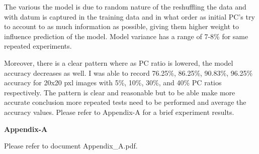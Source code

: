 \documentclass{proposalnsf}
\begin{document}
The various the model is due to random nature of the reshuffling the data and
with datum is captured in the training data and in what order as initial PC's
try to account to as much information as possible, giving them higher weight
to influence prediction of the model. Model variance has a range of 7-8\%
for same repeated experiments.

Moreover, there is a clear pattern where as PC ratio is lowered, the model
accuracy decreases as well. I was able to record 76.25\%, 86.25\%, 90.83\%,
96.25\% accuracy for 20x20 pxl images with 5\%, 10\%, 30\%, and 40\% PC ratios
respectively. The pattern is clear and reasonable but to be able make more accurate conclusion more repeated tests need to be performed and average the accuracy values. Please refer to Appendix-A for a brief experiment results.


\newpage

\noindent
{\bf Appendix-A}

Please refer to document Appendix\_A.pdf.


\newpage



\end{document}
